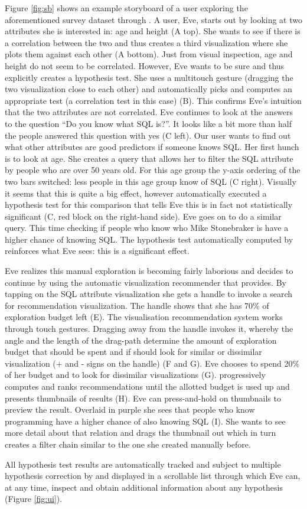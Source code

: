Figure \ref{fig:sb} shows an example storyboard of a user exploring the aforementioned survey dataset through \system{}. A user, Eve, starts out by looking at two attributes she is interested in: age and height (A top). She wants to see if there is a correlation between the two and thus creates a third visualization where she plots them against each other (A bottom). Just from visual inspection, age and height do not seem to be correlated. However, Eve wants to be sure and thus explicitly creates a hypothesis test. She uses a multitouch gesture (dragging the two visualization close to each other) and \system{} automatically picks and computes an appropriate test (a correlation test in this case) (B). This confirms Eve's intuition that the two attributes are not correlated. Eve continues to look at the answers to the question ``Do you know what SQL is?''. It looks like a bit more than half the people answered this question with yes (C left). Our user wants to find out what other attributes are good predictors if someone knows SQL. Her first hunch is to look at age. She creates a query that allows her to filter the SQL attribute by people who are over 50 years old. For this age group the y-axis ordering of the two bars switched: less people in this age group know of SQL (C right). Visually it seems that this is quite a big effect, however \system{} automatically executed a hypothesis test for this comparison that tells Eve this is in fact not statistically significant (C, red block on the right-hand side). Eve goes on to do a similar query. This time checking if people who know who Mike Stonebraker is have a higher chance of knowing SQL. The hypothesis test automatically computed by \system{} reinforces what Eve sees: this is a significant effect. 

Eve realizes this manual exploration is becoming fairly laborious and decides to continue by using the automatic visualization recommender that \system{} provides. By tapping on the SQL attribute visualization she gets a handle to invoke a search for recommendation visualization. The handle shows that she has 70\% of exploration budget left (E). The visualisation recommendation system works through touch gestures. Dragging away from the handle invokes it, whereby the angle and the length of the drag-path determine the amount of exploration budget that should be spent and if \system{} should look for similar or dissimilar visualization (+ and - signs on the handle) (F and G). Eve chooses to spend 20\% of her budget and to look for dissimilar visualizations (G). \system{} progressively computes and ranks recommendations until the allotted budget is used up and presents thumbnails of results (H). Eve can press-and-hold on thumbnails to preview the result. Overlaid in purple she sees that people who know programming have a higher chance of also knowing SQL (I). She wants to see more detail about that relation and drags the thumbnail out which in turn creates a filter chain similar to the one she created manually before. 

All hypothesis test results are automatically tracked and subject to multiple hypothesis correction by \system{} and displayed in a scrollable list through which Eve can, at any time, inspect and obtain additional information about any hypothesis (Figure \ref{fig:ui}). 
